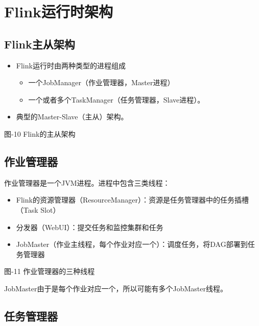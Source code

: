 \hypertarget{flinkux8fd0ux884cux65f6ux67b6ux6784}{%
\section{Flink运行时架构}\label{flinkux8fd0ux884cux65f6ux67b6ux6784}}

\hypertarget{flinkux4e3bux4eceux67b6ux6784}{%
\subsection{Flink主从架构}\label{flinkux4e3bux4eceux67b6ux6784}}

\begin{itemize}
\tightlist
\item
  Flink运行时由两种类型的进程组成

  \begin{itemize}
  \tightlist
  \item
    一个JobManager（作业管理器，Master进程）
  \item
    一个或者多个TaskManager（任务管理器，Slave进程）。
  \end{itemize}
\item
  典型的Master-Slave（主从）架构。
\end{itemize}

图-10 Flink的主从架构

\hypertarget{ux4f5cux4e1aux7ba1ux7406ux5668}{%
\subsection{作业管理器}\label{ux4f5cux4e1aux7ba1ux7406ux5668}}

作业管理器是一个JVM进程。进程中包含三类线程：

\begin{itemize}
\tightlist
\item
  Flink的资源管理器（ResourceManager）：资源是任务管理器中的任务插槽（Task
  Slot）
\item
  分发器（WebUI）：提交任务和监控集群和任务
\item
  JobMaster（作业主线程，每个作业对应一个）：调度任务，将DAG部署到任务管理器
\end{itemize}

图-11 作业管理器的三种线程

JobMaster由于是每个作业对应一个，所以可能有多个JobMaster线程。

\hypertarget{ux4efbux52a1ux7ba1ux7406ux5668}{%
\subsection{任务管理器}\label{ux4efbux52a1ux7ba1ux7406ux5668}}


